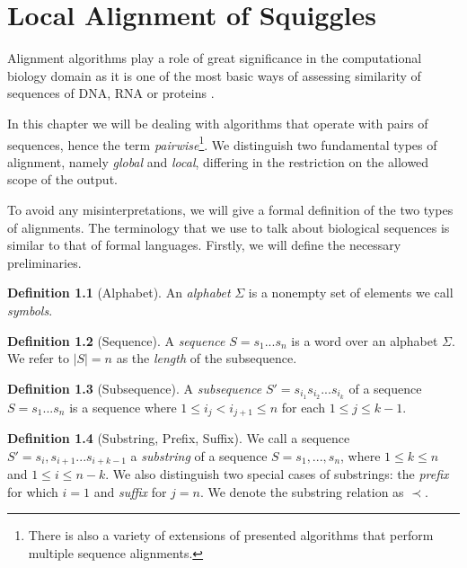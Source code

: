\chapter{Local Alignment of Squiggles}

\label{kap:align}

\theoremstyle{definition}
\newtheorem{definition}{Definition}[section]

\newcommand{\ungap}{\textsc{ungap}}
\newcommand{\subseq}{|}


Alignment algorithms play a role of great significance in the computational biology domain as it is one of the most basic ways of assessing similarity of sequences of DNA, RNA or proteins \cite{Durbin1998}.

In this chapter we will be dealing with algorithms that operate with pairs of sequences, hence the term \textit{pairwise}\footnote{There is also a variety of extensions of presented algorithms that perform multiple sequence alignments.}. We distinguish two fundamental types of alignment, namely \textit{global} and \textit{local}, differing in the restriction on the allowed scope of the output.

To avoid any misinterpretations, we will give a formal definition of the two types of alignments. The terminology that we use to talk about biological sequences is similar to that of formal languages. Firstly, we will define the necessary preliminaries.

\begin{definition}[Alphabet] An \textit{alphabet} $\Sigma$ is a nonempty set of elements we call \textit{symbols}.
\end{definition}

\begin{definition}[Sequence] A \textit{sequence} $S = s_1...s_n$ is a word over an alphabet $\Sigma$. We refer to $|S| = n$ as the \textit{length} of the subsequence.
\end{definition}

\begin{definition}[Subsequence] A \textit{subsequence} $S' = s_{i_1}s_{i_2}...s_{i_k}$ of a sequence $S = s_1...s_n$ is a sequence where $1 \leq i_j < i_{j+1} \leq n$ for each $1 \leq j \leq k-1$.
\end{definition}

\begin{definition}[Substring, Prefix, Suffix] We call a sequence $S' = s_{i},s_{i+1}...s_{i+k-1}$ a \textit{substring} of a sequence $S = s_1,...,s_n$, where $1 \leq k \leq n$ and $1 \leq i \leq n-k$. We also distinguish two special cases of substrings: the \textit{prefix} for which $i = 1$ and \textit{suffix} for $j = n$. We denote the substring relation as $\prec$.
\end{definition}

